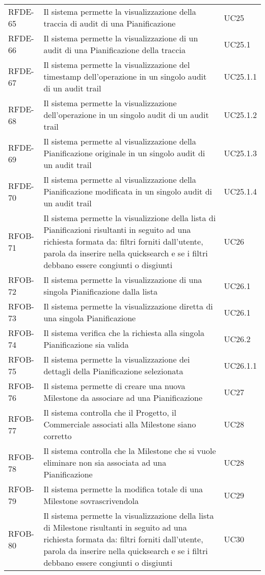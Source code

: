 \begin{center}
\begin{longtable}{p{2.0cm}|p{8cm}|p{2.7cm}}
RFDE-65 & Il sistema permette la visualizzazione della traccia di audit di una Pianificazione & UC25\\
RFDE-66 & Il sistema permette la visualizzazione di un audit di una Pianificazione della traccia & UC25.1\\
RFDE-67 & Il sistema permette la visualizzazione del timestamp dell'operazione in un singolo audit di un audit trail & UC25.1.1\\
RFDE-68 & Il sistema permette la visualizzazione dell'operazione in un singolo audit di un audit trail & UC25.1.2\\
RFDE-69 & Il sistema permette al visualizzazione della Pianificazione originale in un singolo audit di un audit trail & UC25.1.3\\
RFDE-70 & Il sistema permette al visualizzazione della Pianificazione modificata in un singolo audit di un audit trail & UC25.1.4\\
RFOB-71 & Il sistema permette la visualizzione della lista di Pianificazioni risultanti in seguito ad una richiesta formata da: filtri forniti dall'utente, parola da inserire nella quicksearch e se i filtri debbano essere congiunti o disgiunti & UC26\\
RFOB-72 & Il sistema permette la visualizzazione di una singola Pianificazione dalla lista & UC26.1\\
RFOB-73 & Il sistema permette la visualizzazione diretta di una singola Pianificazione & UC26.1\\
RFOB-74 & Il sistema verifica che la richiesta alla singola Pianificazione sia valida & UC26.2\\
RFOB-75 & Il sistema permette la visualizzazione dei dettagli della Pianificazione selezionata & UC26.1.1\\
RFOB-76 & Il sistema permette di creare una nuova Milestone da associare ad una Pianificazione & UC27\\
RFOB-77 & Il sistema controlla che il Progetto, il Commerciale associati alla Milestone siano corretto & UC28\\
RFOB-78 & Il sistema controlla che la Milestone che si vuole eliminare non sia associata ad una Pianificazione & UC28\\
RFOB-79 & Il sistema permette la modifica totale di una Milestone sovrascrivendola & UC29\\
RFOB-80 & Il sistema permette la visualizzazione della lista di Milestone risultanti in seguito ad una richiesta formata da: filtri forniti dall'utente, parola da inserire nella quicksearch e se i filtri debbano essere congiunti o disgiunti & UC30\\

\end{longtable}
\end{center}
